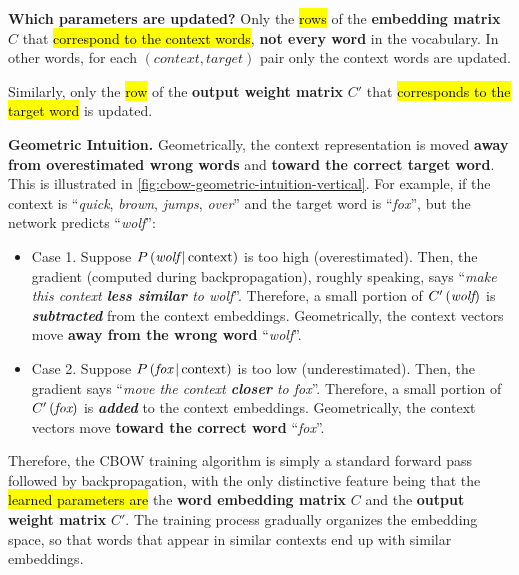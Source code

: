 \textcolor{Green3}{ \textbf{Which parameters are updated?}} Only the \hl{rows} of the \textbf{embedding matrix} $C$ that \hl{correspond to the context words}, \textbf{not every word} in the vocabulary. In other words, for each $(context, target)$ pair only the context words are updated.

\highspace
Similarly, only the \hl{row} of the \textbf{output weight matrix} $C'$ that \hl{corresponds to the target word} is updated.

\highspace
\textcolor{Green3}{ \textbf{Geometric Intuition.}} Geometrically, the context representation is moved \textbf{away from overestimated wrong words} and \textbf{toward the correct target word}. This is illustrated in \autoref{fig:cbow-geometric-intuition-vertical}. For example, if the context is ``\emph{quick}, \emph{brown}, \emph{jumps}, \emph{over}'' and the target word is ``\emph{fox}'', but the network predicts ``\emph{wolf}'':
\begin{itemize}
    \item Case 1. Suppose $P\left(\emph{wolf} \, | \, \text{context}\right)$ is too high (overestimated). Then, the gradient (computed during backpropagation), roughly speaking, says ``\emph{make this context \textbf{less similar} to wolf}''. Therefore, a small portion of $C'\left(\emph{wolf}\right)$ is \emph{\textbf{subtracted}} from the context embeddings. Geometrically, the context vectors move \textbf{away from the wrong word} ``\emph{wolf}''.
    \item Case 2. Suppose $P\left(\emph{fox} \, | \, \text{context}\right)$ is too low (underestimated). Then, the gradient says ``\emph{move the context \textbf{closer} to fox}''. Therefore, a small portion of $C'\left(\emph{fox}\right)$ is \emph{\textbf{added}} to the context embeddings. Geometrically, the context vectors move \textbf{toward the correct word} ``\emph{fox}''.
\end{itemize}
Therefore, the CBOW training algorithm is simply a standard forward pass followed by backpropagation, with the only distinctive feature being that the \hl{learned parameters are} the \textbf{word embedding matrix} $C$ and the \textbf{output weight matrix} $C'$. The training process gradually organizes the embedding space, so that words that appear in similar contexts end up with similar embeddings.

